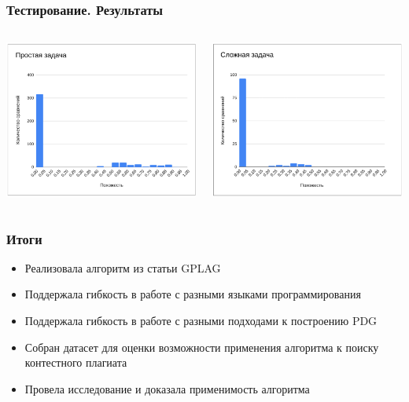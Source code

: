 \documentclass[10pt]{beamer}
\begin{document}
		
\begin{frame}\frametitle{Тестирование. Результаты}
	\begin{columns}
		\centering
		\includegraphics[scale=0.51]{res5.png}
		
		\centering
		\includegraphics[scale=0.51]{res6.png}
		
	\end{columns}
\end{frame}


\begin{frame}\frametitle{Итоги}
	\begin{itemize}
		\item Реализовала алгоритм из статьи GPLAG
		\item Поддержала гибкость в работе с разными языками программирования
		\item Поддержала гибкость в работе с разными подходами к построению PDG
		\item Собран датасет для оценки возможности применения алгоритма к поиску контестного плагиата
		\item Провела исследование и доказала применимость алгоритма
	\end{itemize}
\end{frame}
\end{document}

